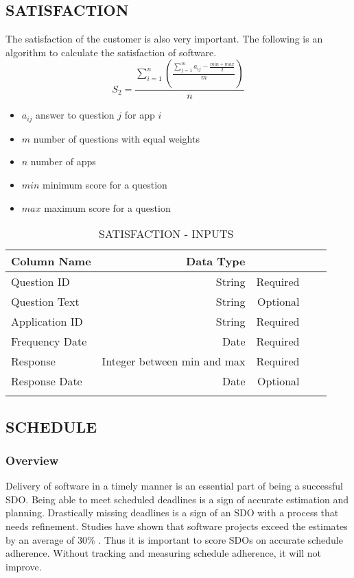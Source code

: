 \documentclass[SDSUThesis.tex]{subfiles}
\begin{document}
\subsection{SATISFACTION}
The satisfaction of the customer is also very important.  The following is an algorithm to calculate the satisfaction of software.
\[
    S_2 = \frac{\sum^n_{i=1}\left( \frac{\sum^m_{j=1}a_{ij}- \frac{min + max}{2}}{m}  \right)}{n}
\]

\begin{itemize}
\item $a_{i j}$ answer to question $j$ for app $i$
\item $m$ number of questions with equal weights
\item $n$ number of apps
\item $min$ minimum score for a question
\item $max$ maximum score for a question
\end{itemize}

\begin{longtable}{@{}l rr rr}

\toprule%
 \centering%
 {\bfseries Column Name}
 & {\bfseries Data Type}
 &  \\

\cmidrule[0.4pt](r{0.125em}){1-1}%
\cmidrule[0.4pt](lr{0.125em}){2-2}%
\cmidrule[0.4pt](l{0.125em}){3-3}%
\endhead

Question ID & String  & Required \\
\myrowcolour%
Question Text & String  & Optional \\
Application ID & String & Required \\
\myrowcolour%
Frequency Date & Date & Required \\
Response & Integer between min and max  & Required \\
\myrowcolour%
Response Date & Date & Optional \\

\bottomrule

\caption{SATISFACTION - INPUTS}
\label{tab:satisfaction}
\end{longtable}


\subsection{SCHEDULE}  

    \subsubsection{Overview}
        Delivery of software in a timely manner is an essential part of being a 
        successful SDO.  Being able to meet scheduled deadlines is a sign of accurate
        estimation and planning.  Drastically missing deadlines is a sign of an SDO
        with a process that needs refinement.  Studies have shown that 
        software projects exceed the estimates by an average of
        30\% \cite{Jorgensen2014}.  Thus it is important to score SDOs on accurate
        schedule adherence. Without tracking and measuring schedule adherence, it will
        not improve.  
        
\end{document}
